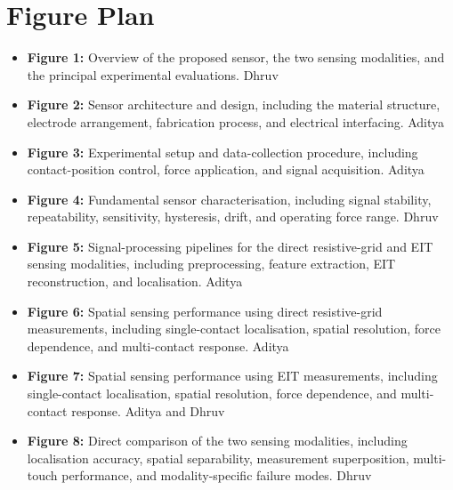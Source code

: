 \section{Figure Plan}
\label{sec:figure-plan}

%

\begin{itemize}
\item \textbf{Figure 1:} Overview of the proposed sensor, the two sensing
modalities, and the principal experimental evaluations. Dhruv

\item \textbf{Figure 2:} Sensor architecture and design, including the
material structure, electrode arrangement, fabrication process, and
electrical interfacing. Aditya 

\item \textbf{Figure 3:} Experimental setup and data-collection procedure,
including contact-position control, force application, and signal
acquisition. Aditya

\item \textbf{Figure 4:} Fundamental sensor characterisation, including
signal stability, repeatability, sensitivity, hysteresis, drift, and
operating force range. Dhruv

\item \textbf{Figure 5:} Signal-processing pipelines for the direct
resistive-grid and EIT sensing modalities, including preprocessing,
feature extraction, EIT reconstruction, and localisation. Aditya

\item \textbf{Figure 6:} Spatial sensing performance using direct
resistive-grid measurements, including single-contact localisation,
spatial resolution, force dependence, and multi-contact response. Aditya

\item \textbf{Figure 7:} Spatial sensing performance using EIT
measurements, including single-contact localisation, spatial resolution,
force dependence, and multi-contact response. Aditya and Dhruv

\item \textbf{Figure 8:} Direct comparison of the two sensing modalities,
including localisation accuracy, spatial separability, measurement
superposition, multi-touch performance, and modality-specific failure
modes. Dhruv


\end{itemize}
